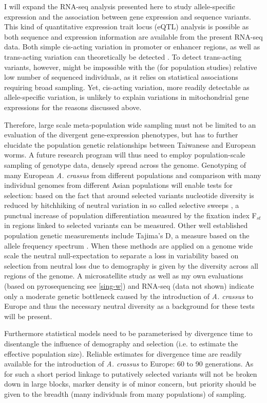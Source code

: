 I will expand the RNA-seq analysis presented here to study
allele-specific expression and the association between gene expression
and sequence variants. This kind of quantitative expression trait
locus (eQTL) analysis is possible as both sequence and expression
information are available from the present RNA-seq data. Both simple
cis-acting variation in promoter or enhancer regions, as well as
trans-acting variation can theoretically be detected
\cite{pmid21838806}. To detect trans-acting variants, however, might
be impossible with the (for population studies) relative low number of
sequenced individuals, as it relies on statistical associations
requiring broad sampling. Yet, cis-acting variation, more readily
detectable as allele-specific variation, is unlikely to explain
variations in mitochondrial gene expressions for the reasons discussed
above.

Therefore, large scale meta-population wide sampling must not be
limited to an evaluation of the divergent gene-expression phenotypes,
but has to further elucidate the population genetic relationships
between Taiwanese and European worms. A future research program will
thus need to employ population-scale sampling of genotype data, densely
spread across the genome. Genotyping of many European
\textit{A. crassus} from different populations and comparison with
many individual genomes from different Asian populations will enable
tests for selection: based on the fact that around selected variants
nucleotide diversity is reduced by hitchhiking of neutral variation in
so called selective sweeps \cite{pmid16251466}, a punctual increase of
population differentiation measured by the fixation index F$_{st}$
\cite{wright1949genetical} in regions linked to selected variants can
be measured. Other well established population genetic measurements
include Tajima's D, a measure based on the allele frequency spectrum
\cite{pmid2513255}. When these methods are applied on a genome wide
scale the neutral null-expectation to separate a loss in variability
based on selection from neutral loss due to demography is given by the
diversity across all regions of the genome. A microsatellite study
\cite{wielgoss_population_2008} as well as my own evaluations (based
on pyrosequencing see \ref{sing-w}) and RNA-seq (data not shown)
indicate only a moderate genetic bottleneck caused by the introduction
of \textit{A. crassus} to Europe and thus the necessary neutral
diversity as a background for these tests will be present.

Furthermore statistical models need to be parameterised by divergence
time to disentangle the influence of demography and selection (i.e. to
estimate the effective population size). Reliable estimates for
divergence time are readily available for the introduction of
\textit{A. crassus} to Europe: 60 to 90 generations. As for such a
short period linkage to putatively selected variants will not be
broken down in large blocks, marker density is of minor concern, but
priority should be given to the breadth (many individuals from many
populations) of sampling.

